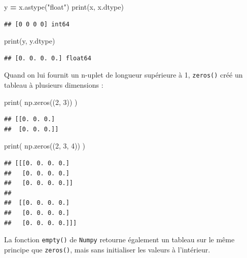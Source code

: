 \documentclass[
  12pt,
]{book}
\newenvironment{Shaded}{\begin{snugshade}}{\end{snugshade}}
\newcommand{\BuiltInTok}[1]{#1}
\newcommand{\DecValTok}[1]{\textcolor[rgb]{0.00,0.00,0.81}{#1}}
\newcommand{\NormalTok}[1]{#1}
\newcommand{\OperatorTok}[1]{\textcolor[rgb]{0.81,0.36,0.00}{\textbf{#1}}}
\newcommand{\StringTok}[1]{\textcolor[rgb]{0.31,0.60,0.02}{#1}}
\numberwithin{equation}{section}
\numberwithin{countremarque}{section}
\begin{document}
\begin{Shaded}
\begin{Highlighting}[]
\NormalTok{y }\OperatorTok{=}\NormalTok{ x.astype(}\StringTok{"float"}\NormalTok{)}
\BuiltInTok{print}\NormalTok{(x, x.dtype)}
\end{Highlighting}
\end{Shaded}

\begin{lstlisting}
## [0 0 0 0] int64
\end{lstlisting}

\begin{Shaded}
\begin{Highlighting}[]
\BuiltInTok{print}\NormalTok{(y, y.dtype)}
\end{Highlighting}
\end{Shaded}

\begin{lstlisting}
## [0. 0. 0. 0.] float64
\end{lstlisting}

Quand on lui fournit un n-uplet de longueur supérieure à 1, \texttt{zeros()} créé un tableau à plusieurs dimensions :

\begin{Shaded}
\begin{Highlighting}[]
\BuiltInTok{print}\NormalTok{( np.zeros((}\DecValTok{2}\NormalTok{, }\DecValTok{3}\NormalTok{)) )}
\end{Highlighting}
\end{Shaded}

\begin{lstlisting}
## [[0. 0. 0.]
##  [0. 0. 0.]]
\end{lstlisting}

\begin{Shaded}
\begin{Highlighting}[]
\BuiltInTok{print}\NormalTok{( np.zeros((}\DecValTok{2}\NormalTok{, }\DecValTok{3}\NormalTok{, }\DecValTok{4}\NormalTok{)) )}
\end{Highlighting}
\end{Shaded}

\begin{lstlisting}
## [[[0. 0. 0. 0.]
##   [0. 0. 0. 0.]
##   [0. 0. 0. 0.]]
## 
##  [[0. 0. 0. 0.]
##   [0. 0. 0. 0.]
##   [0. 0. 0. 0.]]]
\end{lstlisting}

La fonction \texttt{empty()} de \texttt{Numpy} retourne également un tableau sur le même principe que \texttt{zeros()}, mais sans initialiser les valeurs à l'intérieur.
\end{document}
